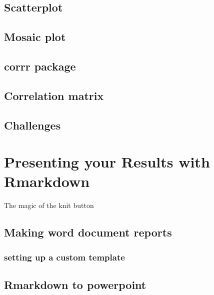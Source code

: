 \documentclass[
]{book}
\begin{document}
\hypertarget{scatterplot}{%
\section{Scatterplot}\label{scatterplot}}

\hypertarget{mosaic-plot}{%
\section{Mosaic plot}\label{mosaic-plot}}

\hypertarget{corrr-package}{%
\section{corrr package}\label{corrr-package}}

\hypertarget{correlation-matrix}{%
\section{Correlation matrix}\label{correlation-matrix}}

\hypertarget{challenges-1}{%
\section{Challenges}\label{challenges-1}}

\hypertarget{presenting-your-results-with-rmarkdown}{%
\chapter{Presenting your Results with Rmarkdown}\label{presenting-your-results-with-rmarkdown}}

The magic of the knit button

\hypertarget{making-word-document-reports}{%
\section{Making word document reports}\label{making-word-document-reports}}

\hypertarget{setting-up-a-custom-template}{%
\subsection{setting up a custom template}\label{setting-up-a-custom-template}}

\hypertarget{rmarkdown-to-powerpoint}{%
\section{Rmarkdown to powerpoint}\label{rmarkdown-to-powerpoint}}
\end{document}
